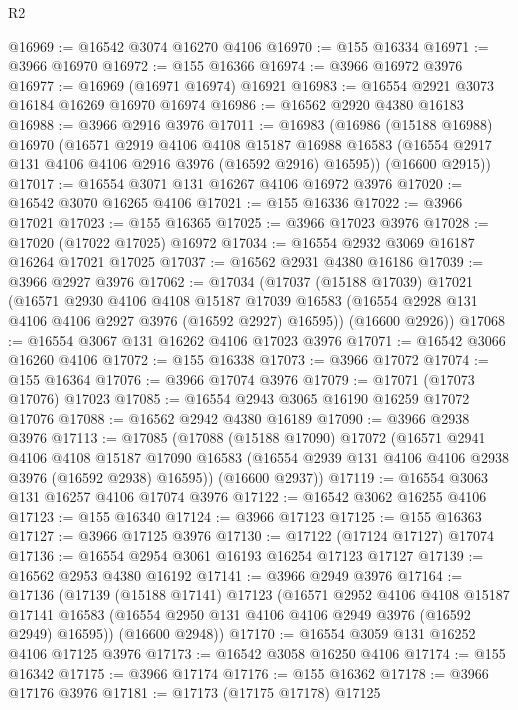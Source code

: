 \begin{lexlean}{R2}
\begin{coremodule}
@16969 := @16542 @3074 @16270 @4106
@16970 := @155 @16334
@16971 := @3966 @16970
@16972 := @155 @16366
@16974 := @3966 @16972 @3976
@16977 := @16969 (@16971 @16974) @16921
@16983 := @16554 @2921 @3073 @16184 @16269 @16970 @16974
@16986 := @16562 @2920 @4380 @16183
@16988 := @3966 @2916 @3976
@17011 := @16983
    (@16986
      (@15188 @16988)
      @16970
      (@16571
        @2919
        @4106
        @4108
        @15187
        @16988
        @16583
        (@16554 @2917 @131 @4106 @4106 @2916 @3976 (@16592 @2916) @16595))
      (@16600 @2915))
@17017 := @16554 @3071 @131 @16267 @4106 @16972 @3976
@17020 := @16542 @3070 @16265 @4106
@17021 := @155 @16336
@17022 := @3966 @17021
@17023 := @155 @16365
@17025 := @3966 @17023 @3976
@17028 := @17020 (@17022 @17025) @16972
@17034 := @16554 @2932 @3069 @16187 @16264 @17021 @17025
@17037 := @16562 @2931 @4380 @16186
@17039 := @3966 @2927 @3976
@17062 := @17034
    (@17037
      (@15188 @17039)
      @17021
      (@16571
        @2930
        @4106
        @4108
        @15187
        @17039
        @16583
        (@16554 @2928 @131 @4106 @4106 @2927 @3976 (@16592 @2927) @16595))
      (@16600 @2926))
@17068 := @16554 @3067 @131 @16262 @4106 @17023 @3976
@17071 := @16542 @3066 @16260 @4106
@17072 := @155 @16338
@17073 := @3966 @17072
@17074 := @155 @16364
@17076 := @3966 @17074 @3976
@17079 := @17071 (@17073 @17076) @17023
@17085 := @16554 @2943 @3065 @16190 @16259 @17072 @17076
@17088 := @16562 @2942 @4380 @16189
@17090 := @3966 @2938 @3976
@17113 := @17085
    (@17088
      (@15188 @17090)
      @17072
      (@16571
        @2941
        @4106
        @4108
        @15187
        @17090
        @16583
        (@16554 @2939 @131 @4106 @4106 @2938 @3976 (@16592 @2938) @16595))
      (@16600 @2937))
@17119 := @16554 @3063 @131 @16257 @4106 @17074 @3976
@17122 := @16542 @3062 @16255 @4106
@17123 := @155 @16340
@17124 := @3966 @17123
@17125 := @155 @16363
@17127 := @3966 @17125 @3976
@17130 := @17122 (@17124 @17127) @17074
@17136 := @16554 @2954 @3061 @16193 @16254 @17123 @17127
@17139 := @16562 @2953 @4380 @16192
@17141 := @3966 @2949 @3976
@17164 := @17136
    (@17139
      (@15188 @17141)
      @17123
      (@16571
        @2952
        @4106
        @4108
        @15187
        @17141
        @16583
        (@16554 @2950 @131 @4106 @4106 @2949 @3976 (@16592 @2949) @16595))
      (@16600 @2948))
@17170 := @16554 @3059 @131 @16252 @4106 @17125 @3976
@17173 := @16542 @3058 @16250 @4106
@17174 := @155 @16342
@17175 := @3966 @17174
@17176 := @155 @16362
@17178 := @3966 @17176 @3976
@17181 := @17173 (@17175 @17178) @17125

\end{coremodule}
\end{lexlean}

